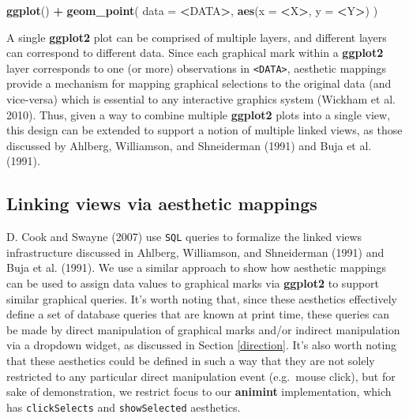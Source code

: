 \documentclass[12pt,]{article}
\newenvironment{Shaded}{\begin{snugshade}}{\end{snugshade}}
\newcommand{\DataTypeTok}[1]{\textcolor[rgb]{0.13,0.29,0.53}{#1}}
\newcommand{\KeywordTok}[1]{\textcolor[rgb]{0.13,0.29,0.53}{\textbf{#1}}}
\newcommand{\NormalTok}[1]{#1}
\newcommand{\OperatorTok}[1]{\textcolor[rgb]{0.81,0.36,0.00}{\textbf{#1}}}
\newcommand{\StringTok}[1]{\textcolor[rgb]{0.31,0.60,0.02}{#1}}
\theoremstyle{definition}
\theoremstyle{definition}
\theoremstyle{definition}
\theoremstyle{remark}
\begin{document}
\begin{Shaded}
\begin{Highlighting}[]
\KeywordTok{ggplot}\NormalTok{() }\OperatorTok{+}\StringTok{ }\KeywordTok{geom_point}\NormalTok{(}
  \DataTypeTok{data =} \OperatorTok{<}\NormalTok{DATA}\OperatorTok{>}\NormalTok{, }
  \KeywordTok{aes}\NormalTok{(}\DataTypeTok{x =} \OperatorTok{<}\NormalTok{X}\OperatorTok{>}\NormalTok{, }\DataTypeTok{y =} \OperatorTok{<}\NormalTok{Y}\OperatorTok{>}\NormalTok{)}
\NormalTok{)}
\end{Highlighting}
\end{Shaded}

A single \textbf{ggplot2} plot can be comprised of multiple layers, and
different layers can correspond to different data. Since each graphical
mark within a \textbf{ggplot2} layer corresponds to one (or more)
observations in \texttt{\textless{}DATA\textgreater{}}, aesthetic
mappings provide a mechanism for mapping graphical selections to the
original data (and vice-versa) which is essential to any interactive
graphics system (Wickham et al. 2010). Thus, given a way to combine
multiple \textbf{ggplot2} plots into a single view, this design can be
extended to support a notion of multiple linked views, as those
discussed by Ahlberg, Williamson, and Shneiderman (1991) and Buja et al.
(1991).

\hypertarget{extension}{%
\subsection{Linking views via aesthetic mappings}\label{extension}}

D. Cook and Swayne (2007) use \texttt{SQL} queries to formalize the
linked views infrastructure discussed in Ahlberg, Williamson, and
Shneiderman (1991) and Buja et al. (1991). We use a similar approach to
show how aesthetic mappings can be used to assign data values to
graphical marks via \textbf{ggplot2} to support similar graphical
queries. It's worth noting that, since these aesthetics effectively
define a set of database queries that are known at print time, these
queries can be made by direct manipulation of graphical marks and/or
indirect manipulation via a dropdown widget, as discussed in Section
\ref{direction}. It's also worth noting that these aesthetics could be
defined in such a way that they are not solely restricted to any
particular direct manipulation event (e.g.~mouse click), but for sake of
demonstration, we restrict focus to our \textbf{animint} implementation,
which has \texttt{clickSelects} and \texttt{showSelected} aesthetics.
\end{document}
